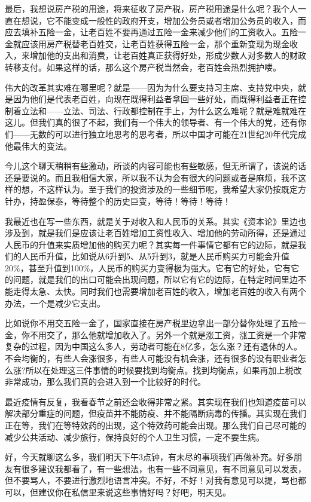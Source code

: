 \documentclass[UTF8, 12pt, a4paper]{ctexrep}
\begin{document}
最后，我想说房产税的用途，将来征收了房产税，房产税用途是什么呢？我个人一直在想说，它不能变成一般性的政府开支，增加公务员或者增加公务员的收入，而应去填补五险一金，让老百姓不要再通过五险一金来减少他们的工资收入。五险一金就应该用房产税替老百姓交，让老百姓获得五险一金，那个重新变现为现金收入，来增加他的支出和消费，让老百姓真正获得好处，形成少数人对多数人的财政转移支付。如果这样的话，那么这个房产税当然会，老百姓会热烈拥护喽。

伟大的改革其实难在哪里呢？就是——因为为什么要支持习主席、支持党中央，就是因为他们是代表老百姓，向现在既得利益者拿回一些好处，而既得利益者正在控制着立法和——立法、司法、行政都控制在手上，为什么这么难呢？就是难就难在这儿。但我们真的很了不起，我们有一个伟大的领导者、有一个伟大的党，还有你们——无数的可以进行独立地思考的思考者，所以中国才可能在21世纪20年代完成他最伟大的变法。

今儿这个聊天稍稍有些激动，所谈的内容可能也有些敏感，但无所谓了，该说的话还是要说的。而且我相信大家，所以我不认为会有很大的问题或者是麻烦，我不这样的想，不这样认为。至于我们的投资涉及的一些细节呢，我希望大家仍按既定方针办，持盈保泰，等待整个的历史巨变，等待！等待！等待！

我最近也在写一些东西，就是关于对收入和人民币的关系。其实《资本论》里边也涉及到，就是我们是应该让老百姓增加工资性收入、增加他的劳动所得，还是通过人民币的升值来实质增加他的购买力呢？其实每一件事情它都有它的边际，就是我们的人民币升值，比如说从6升到5、从5升到3，就是人民币购买力可能会升值20\%，甚至升值到100\%，人民币的购买力变得极为强大。它有它的好处，它有它的问题，就是我们的出口可能会出现问题，所以它有它的边际，在特定时间里边不能走得太急、太快。同时我们也需要增加老百姓的收入，增加老百姓的收入有两个办法，一个是减少它支出。

比如说你不用交五险一金了，国家直接在房产税里边拿出一部分替你处理了五险一金，你不用交了，那么他就增加收入了。另外一个就是涨工资，涨工资是一个非常复杂的过程，因为中国这么多人，劳动者可能在8亿多，怎么涨？还有退休的人。不会均衡的，有些人会涨很多，有些人可能没有机会涨，还有很多的没有职业者怎么涨?所以在处理这三件事情的时候要找到均衡点。找到均衡点，如果再加上税改非常成功，那么我们真的会进入到一个比较好的时代。

最近疫情有反复，我看春节之前还会收得非常之紧。其实现在我们也知道疫苗可以解决部分重症的问题，但疫苗并不能防疫、并不能隔断病毒的传播。其实现在我们正在等，我们在等特效药的出现，这个特效药可能会出现。那么我们自己尽可能的减少公共活动、减少旅行，保持良好的个人卫生习惯，一定不要生病。

好，今天就聊这么多，我们明天下午3点钟，有未尽的事项我们再做补充。好多朋友有很多建议我都看了，有一些想法，也有一些不同意见，有不同意见可以发表，但不要骂人，不要进行激烈地语言冲突。不好，不好！对我有意见可以提，骂也都可以，但建议你在私信里来说这些事情好吗？好吧，明天见。
\end{document}
